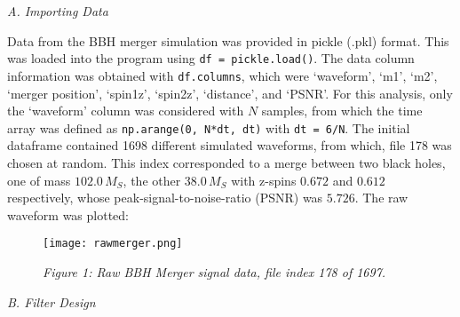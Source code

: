 \documentclass[12pt]{article}
\begin{document}
\begin{multicols}{2}
\begin{center}
\vspace{5pt}

    \textit{A. Importing Data}

\vspace{-5pt}
\end{center}

Data from the BBH merger simulation was provided in pickle (.pkl) format. This was loaded into the program using \verb!df = pickle.load()!. The data column information was obtained with \verb!df.columns!, which were `waveform', `m1', `m2', `merger position', `spin1z', `spin2z', `distance', and `PSNR'. For this analysis, only the `waveform' column was considered with $N$ samples, from which the time array was defined as \verb!np.arange(0, N*dt, dt)! with \verb!dt = 6/N!. The initial dataframe contained 1698 different simulated waveforms, from which, file 178 was chosen at random. This index corresponded to a merge between two black holes, one of mass $102.0 \, M_S$, the other $38.0\, M_S$ with z-spins $0.672$ and $0.612$ respectively, whose peak-signal-to-noise-ratio (PSNR) was $5.726$. The raw waveform was plotted:
\begin{figure}[H]
    \centering
    \texttt{[image: rawmerger.png]}
    \caption*{\textit{Figure 1: Raw BBH Merger signal data, file index 178 of 1697.}}
\end{figure}

\begin{center}
    \textit{B. Filter Design}\\
\end{center}


\end{multicols}
\end{document}
